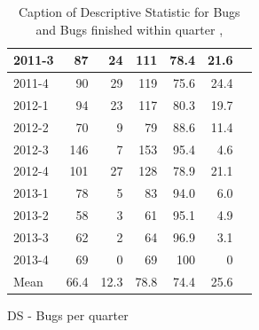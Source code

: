 \documentclass[UKenglish]{ifimaster}  %
\begin{document}
\begin{appendices}
\begin{table}[!htbp]
\begin{adjustwidth}{-2.5cm}{}
\begin{subfigure}[b]{0.4\textwidth}
{\begin{tabular}{ | l | r | r | r | r | r | r | }
2011-3 & 87 & 24 & 111 & 78.4 & 21.6\\ \hline
2011-4 & 90 & 29 & 119 & 75.6 & 24.4 \\ \hline
2012-1 & 94 & 23 & 117 & 80.3 & 19.7 \\ \hline
2012-2 & 70 & 9 & 79 & 88.6 & 11.4\\ \hline
2012-3 & 146 & 7 & 153 & 95.4 & 4.6\\ \hline
2012-4 & 101 & 27 & 128 & 78.9& 21.1 \\ \hline
2013-1 & 78 & 5 & 83 & 94.0 & 6.0 \\ \hline
2013-2 & 58 & 3 & 61 & 95.1 & 4.9 \\ \hline
2013-3 & 62 & 2 & 64 & 96.9 & 3.1 \\ \hline
2013-4 & 69 & 0 & 69 & 100 & 0 \\ \hline
Mean & 66.4&12.3&78.8&74.4&25.6 \\ \hline
\end{tabular}
}
\caption{DS - Bugs per quarter}
 \label{DS:FTPQ:2}
\end{subfigure}
\end{adjustwidth}
\caption[Optional caption for list of figures]{Caption of Descriptive Statistic for Bugs and Bugs finished within quarter  , }
\label{DS:2:5} %
\end{table}
 




\end{appendices}
\end{document}
